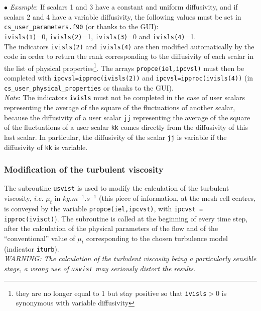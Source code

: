 {{{\begin{list}{$\bullet$}{}
{\em Example}: If scalars 1 and 3 have a constant and uniform
      diffusivity, and if scalars 2 and 4 have a variable diffusivity,
      the following values must be set in \texttt{cs\_user\_parameters.f90} (or thanks to the GUI): \\
      \texttt{ivisls(1)}=0, \texttt{ivisls(2)}=1, \texttt{ivisls(3)}=0
      and \texttt{ivisls(4)}=1. \\
      The indicators \texttt{ivisls(2)} and \texttt{ivisls(4)} are then
      modified automatically by the code in order to return the rank
      corresponding to the diffusivity of each scalar in the list of physical
      properties\footnote{they are no longer equal to 1 but stay positive
      so that \texttt{ivisls}$>$0 is synonymous with variable diffusivity}.
      The arrays \mbox{\texttt{propce(iel,ipcvsl)}} must
      then be completed with \texttt{ipcvsl=ipproc(ivisls(2))} and
      \texttt{ipcvsl=ipproc(ivisls(4))} (in \texttt{cs\_user\_physical\_properties} or thanks to the GUI). \\

{\em Note}: The indicators \texttt{ivisls} must not be completed in the case of
      user scalars representing the average of the square of the
      fluctuations of another scalar, because the diffusivity of a user
      scalar \texttt{jj} representing the average of the square of the
      fluctuations of a user scalar \texttt{kk} comes directly from the
      diffusivity of this last scalar. In particular, the diffusivity
      of the scalar \texttt{jj} is variable if the diffusivity of \texttt{kk}
      is variable.
\end{list}


\subsubsection{Modification of the turbulent viscosity}

The subroutine \texttt{usvist} is used to modify the calculation of the turbulent
viscosity, {\em i.e.} $\mu_t$ in $kg.m^{-1}.s^{-1}$
(this piece of information, at the mesh cell centres, is conveyed by the
variable \texttt{propce(iel,ipcvst)}, with
\texttt{ipcvst =  ipproc(ivisct)}). The
subroutine is called at the beginning of every time step, after the
calculation of the physical parameters of the flow and of the
``conventional'' value of $\mu_t$ corresponding to the chosen turbulence
model (indicator \texttt{iturb}).\\
{\em WARNING: The calculation of the turbulent viscosity being a
particularly sensible stage, a wrong use of {\em\texttt{usvist}} may
seriously distort the results.}

}}}
